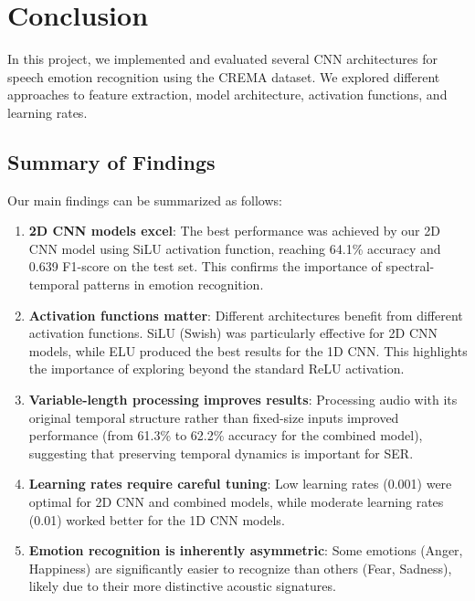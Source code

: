 \section{Conclusion}

In this project, we implemented and evaluated several CNN architectures for speech emotion recognition using the CREMA dataset. We explored different approaches to feature extraction, model architecture, activation functions, and learning rates.

\subsection{Summary of Findings}

Our main findings can be summarized as follows:

\begin{enumerate}
    \item \textbf{2D CNN models excel}: The best performance was achieved by our 2D CNN model using SiLU activation function, reaching 64.1\% accuracy and 0.639 F1-score on the test set. This confirms the importance of spectral-temporal patterns in emotion recognition.
    
    \item \textbf{Activation functions matter}: Different architectures benefit from different activation functions. SiLU (Swish) was particularly effective for 2D CNN models, while ELU produced the best results for the 1D CNN. This highlights the importance of exploring beyond the standard ReLU activation.
    
    \item \textbf{Variable-length processing improves results}: Processing audio with its original temporal structure rather than fixed-size inputs improved performance (from 61.3\% to 62.2\% accuracy for the combined model), suggesting that preserving temporal dynamics is important for SER.
    
    \item \textbf{Learning rates require careful tuning}: Low learning rates (0.001) were optimal for 2D CNN and combined models, while moderate learning rates (0.01) worked better for the 1D CNN models.
    
    \item \textbf{Emotion recognition is inherently asymmetric}: Some emotions (Anger, Happiness) are significantly easier to recognize than others (Fear, Sadness), likely due to their more distinctive acoustic signatures.
\end{enumerate}


